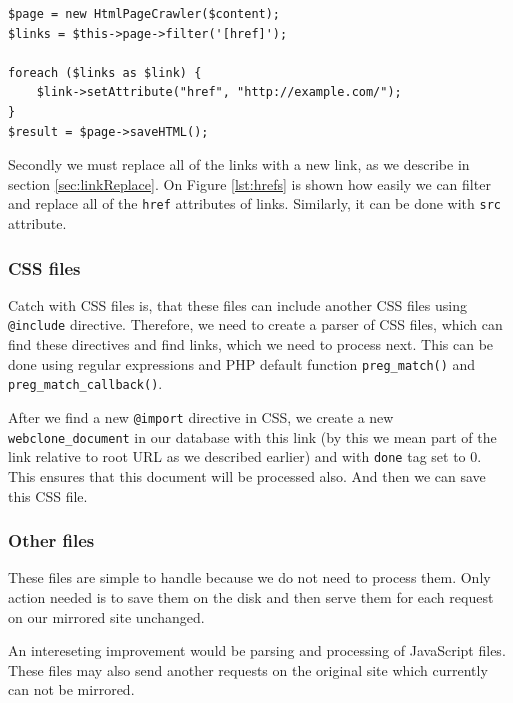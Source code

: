 \begin{lstlisting}[caption={Example of finding and replacing href attributes in an HTML document},label={lst:hrefs}]
$page = new HtmlPageCrawler($content);
$links = $this->page->filter('[href]');

foreach ($links as $link) {
	$link->setAttribute("href", "http://example.com/");
}
$result = $page->saveHTML();
\end{lstlisting}

Secondly we must replace all of the links with a new link, as we describe in section \ref{sec:linkReplace}. On Figure \ref{lst:hrefs} is shown how easily we can filter and replace all of the \texttt{href} attributes of links. Similarly, it can be done with \texttt{src} attribute.

\subsubsection{CSS files}
Catch with CSS files is, that these files can include another CSS files using \texttt{@include} directive. Therefore, we need to create a parser of CSS files, which can find these directives and find links, which we need to process next. This can be done using regular expressions and PHP default function \texttt{preg\_match()} and \texttt{preg\_match\_callback()}.

After we find a new \texttt{@import} directive in CSS, we create a new \texttt{webclone\_document} in our database with this link (by this we mean part of the link relative to root URL as we described earlier) and with \texttt{done} tag set to 0. This ensures that this document will be processed also. And then we can save this CSS file.

\subsubsection{Other files}
These files are simple to handle because we do not need to process them. Only action needed is to save them on the disk and then serve them for each request on our mirrored site unchanged.

An intereseting improvement would be parsing and processing of JavaScript files. These files may also send another requests on the original site which currently can not be mirrored.


